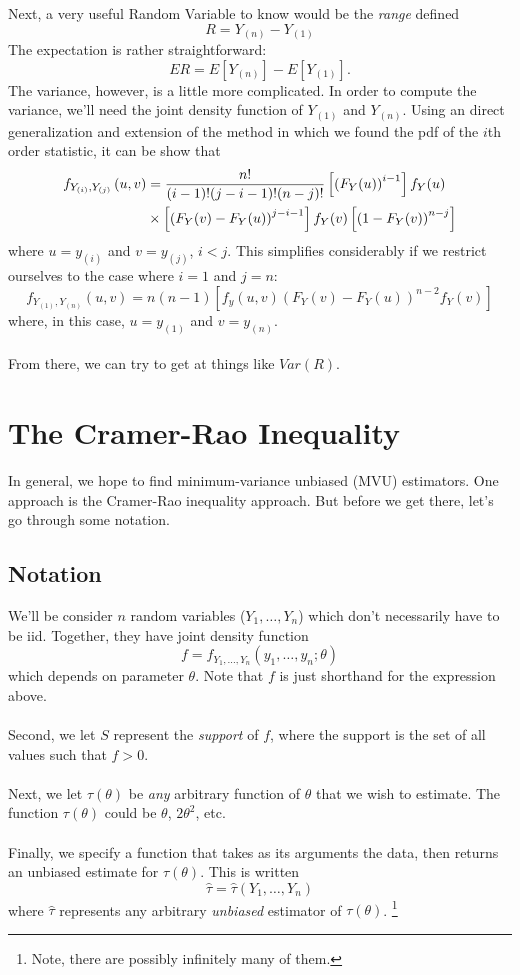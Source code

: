 \documentclass[a4paper,12pt]{scrartcl}
\begin{document}
Next, a very useful Random Variable to know would be the \emph{range}
defined
   \[ R = Y_{(n)} - Y_{(1)}\]
The expectation is rather straightforward:
   \[ ER = E\left[Y_{(n)}\right] - E\left[Y_{(1)}\right].\]
The variance, however, is a little more complicated.  In order to 
compute the variance, we'll need the joint density function of 
$Y_{(1)}$ and $Y_{(n)}$. 
Using an direct generalization and extension of the method in which
we found the pdf of the $i$th order statistic, it can be show that 
\begin{align}
   f_{Y_{(i)}, Y_{(j)}}\left(u, v\right) 
   &= \frac{n!}{(i-1)!(j-i-1)!(n-j)!} 
   \left[\left(F_Y(u)\right)^{i-1}\right] f_Y(u)
   \notag \\
   &\times\left[\left(F_Y(v) - F_Y(u)\right)^{j-i-1}\right]
   f_Y(v) \left[\left(1-F_Y(v)\right)^{n-j}\right]
\end{align}
where $u = y_{(i)}$ and $v = y_{(j)}$, $i<j$.  
This simplifies considerably if we restrict ourselves to the case where
$i=1$ and $j=n$:
   \[ f_{Y_{(1)}, Y_{(n)}}\left(u, v\right) =
      n(n-1) \left[ f_y( u, v) \left( F_Y(v) - F_Y(u)\right)^{n-2}
	 f_Y(v)\right] \]
where, in this case, $u = y_{(1)}$ and $v = y_{(n)}$.  
\\
\\
From there, we can try to get at things like $Var(R)$.


\newpage


\section{The Cramer-Rao Inequality}

In general, we hope to find minimum-variance unbiased (MVU) 
estimators. One approach is the Cramer-Rao inequality approach. But
before we get there, let's go through some notation.

\subsection{Notation}

We'll be consider $n$ random variables ($Y_1, \ldots, Y_n$) which
don't necessarily have to be iid. Together, they have joint density
function 
   \[ f = f_{Y_1, \ldots, Y_n}(y_1, \ldots, y_n; \theta) \]
which depends on parameter $\theta$. Note that $f$ is just shorthand
for the expression above.
\\
\\
Second, we let $S$ represent the \emph{support} of $f$, where the 
support is the set of all values such that $f > 0$.
\\
\\
Next, we let $\tau(\theta)$ be \emph{any} arbitrary function of $\theta$
that we wish to estimate. The function $\tau(\theta)$ could be 
$\theta$, $2\theta^2$, etc. 
\\
\\
Finally, we specify a function that takes as its arguments the 
data, then returns an unbiased estimate for $\tau(\theta)$.  
This is written
   \[\hat{\tau} =  \hat{\tau}(Y_1, \ldots, Y_n) \]
where $\hat{\tau}$ represents any arbitrary \emph{unbiased} estimator of 
$\tau(\theta)$. \footnote{Note, there are possibly infinitely many of 
them.}
\end{document}
